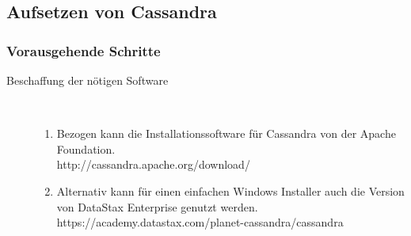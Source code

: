 \documentclass[a4paper, 12pt]{scrartcl}
\begin{document}
\subsection{Aufsetzen von Cassandra}
\subsubsection{Vorausgehende Schritte}
\begin{description}
   \item[Beschaffung der nötigen Software]~\par
   \begin{enumerate}
      \item Bezogen kann die Installationssoftware für Cassandra von der Apache Foundation. \\http://cassandra.apache.org/download/
      \item Alternativ kann für einen einfachen Windows Installer auch die Version von DataStax Enterprise genutzt werden.\\ https://academy.datastax.com/planet-cassandra/cassandra

   \end{enumerate}  
  
\end{description}
\end{document}
